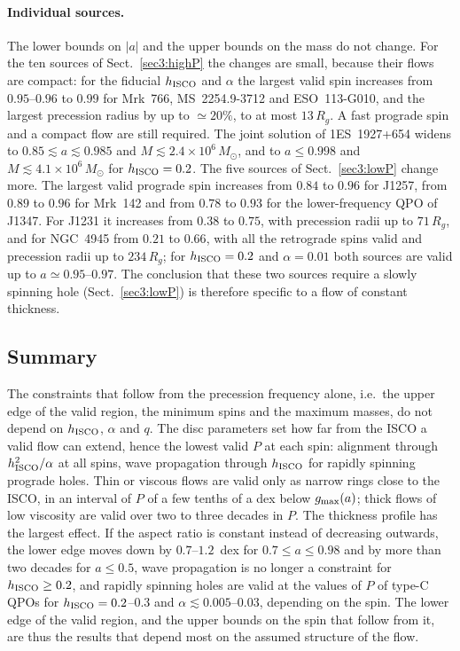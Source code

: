 \paragraph{Individual sources.}
The lower bounds on $|a|$ and the upper bounds on the mass do not change.
For the ten sources of Sect.~\ref{sec3:highP} the changes are small, because their flows are compact: for the fiducial $h_\textup{ISCO}$ and $\alpha$ the largest valid spin increases from $0.95$--$0.96$ to $0.99$ for Mrk~766, MS~2254.9-3712 and ESO~113-G010, and the largest precession radius by up to $\simeq20\%$, to at most $13\,R_g$.
A fast prograde spin and a compact flow are still required.
The joint solution of 1ES~1927+654 widens to $0.85\lesssim a\lesssim0.985$ and $M\lesssim2.4\times10^6\,M_\odot$, and to $a\leq0.998$ and $M\lesssim4.1\times10^6\,M_\odot$ for $h_\textup{ISCO}=0.2$.
The five sources of Sect.~\ref{sec3:lowP} change more.
The largest valid prograde spin increases from $0.84$ to $0.96$ for J1257, from $0.89$ to $0.96$ for Mrk~142 and from $0.78$ to $0.93$ for the lower-frequency QPO of J1347.
For J1231 it increases from $0.38$ to $0.75$, with precession radii up to $71\,R_g$, and for NGC~4945 from $0.21$ to $0.66$, with all the retrograde spins valid and precession radii up to $234\,R_g$; for $h_\textup{ISCO}=0.2$ and $\alpha=0.01$ both sources are valid up to $a\simeq0.95$--$0.97$.
The conclusion that these two sources require a slowly spinning hole (Sect.~\ref{sec3:lowP}) is therefore specific to a flow of constant thickness.

\subsection{Summary}
\label{appA:summary}

The constraints that follow from the precession frequency alone, i.e.\ the upper edge of the valid region, the minimum spins and the maximum masses, do not depend on $h_\textup{ISCO}$, $\alpha$ and $q$.
The disc parameters set how far from the ISCO a valid flow can extend, hence the lowest valid $P$ at each spin: alignment through $h_\textup{ISCO}^{2}/\alpha$ at all spins, wave propagation through $h_\textup{ISCO}$ for rapidly spinning prograde holes.
Thin or viscous flows are valid only as narrow rings close to the ISCO, in an interval of $P$ of a few tenths of a dex below $g_\textup{max}(a)$; thick flows of low viscosity are valid over two to three decades in $P$.
The thickness profile has the largest effect.
If the aspect ratio is constant instead of decreasing outwards, the lower edge moves down by $0.7$--$1.2$~dex for $0.7\leq a\leq0.98$ and by more than two decades for $a\leq0.5$, wave propagation is no longer a constraint for $h_\textup{ISCO}\geq0.2$, and rapidly spinning holes are valid at the values of $P$ of type-C QPOs for $h_\textup{ISCO}=0.2$--$0.3$ and $\alpha\lesssim0.005$--$0.03$, depending on the spin.
The lower edge of the valid region, and the upper bounds on the spin that follow from it, are thus the results that depend most on the assumed structure of the flow.


